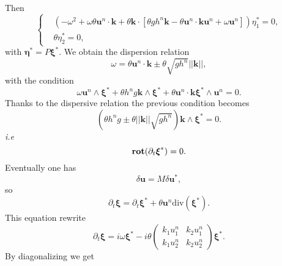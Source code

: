 \documentclass[a4paper, 11pt]{article}
\begin{document}
Then
\begin{equation*}
\left\{
\begin{split}
&\left(-\omega^2+\omega \theta\boldsymbol{u}^n\cdot \boldsymbol{k}+\theta\boldsymbol{k}\cdot \left[\theta gh^n\boldsymbol{k}-\theta \boldsymbol{u}^n\cdot \boldsymbol{k}\boldsymbol{u}^n+\omega \boldsymbol{u}^n
\right]\right)\eta_1^*=0,\\
&\theta \eta_2^*=0,
\end{split}\right.
\end{equation*}
with $\boldsymbol{\eta}^*=P\boldsymbol{\xi}^*$.
We obtain the dispersion relation
\begin{equation*}
\omega=\theta\boldsymbol{u}^n\cdot \boldsymbol{k}\pm\theta\sqrt{gh^n}||\boldsymbol{k}||,
\end{equation*} 
with the condition
\begin{equation*}
\omega \boldsymbol{u}^n\wedge \boldsymbol{\xi}^*+\theta h^ng\boldsymbol{k}\wedge \boldsymbol{\xi}^*+\theta\boldsymbol{u}^n\cdot \boldsymbol{k}\boldsymbol{\xi}^*\wedge \boldsymbol{u}^n=0.
\end{equation*}
Thanks to the dispersive relation the previous condition becomes
\begin{equation*}
\left(\theta h^ng\pm \theta||\boldsymbol{k}||\sqrt{gh^n}\right)\boldsymbol{k}\wedge \boldsymbol{\xi}^*=0.
\end{equation*}
\textit{i.e}
\begin{equation*}
\text{\textbf{rot}}(\partial_t\boldsymbol{\xi}^*)=0.
\end{equation*}
Eventually one has
\begin{equation*}
\delta \boldsymbol{u}=M\delta \boldsymbol{u}^*,
\end{equation*}
so \begin{equation*}
\partial_t \boldsymbol{\xi}=\partial_t\boldsymbol{\xi}^*+\theta\boldsymbol{u}^n\text{div}(\boldsymbol{\xi}^*). 
\end{equation*}
This equation rewrite
\begin{equation*}
\partial_t \boldsymbol{\xi}=i\omega\boldsymbol{\xi}^*-i\theta\begin{pmatrix}k_1u_1^n&k_2u_1^n\\k_1u_2^n&k_2u_2^n\end{pmatrix}\boldsymbol{\xi}^*.
\end{equation*}
By diagonalizing we get
\end{document}
